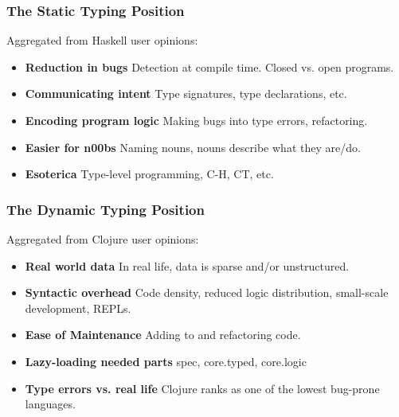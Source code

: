\documentclass{beamer}
\begin{document}

\begin{frame}
  \frametitle{The Static Typing Position}
  Aggregated from Haskell user opinions:
  \begin{itemize}
  \item \textbf{Reduction in bugs} Detection at compile time.  Closed vs. open
    programs.
  \item \textbf{Communicating intent} Type signatures, type declarations, etc.
  \item \textbf{Encoding program logic} Making bugs into type errors, refactoring.
  \item \textbf{Easier for n00bs} Naming nouns, nouns describe what they are/do.
  \item \textbf{Esoterica} Type-level programming, C-H, CT, etc.
  \end{itemize}
\end{frame}

\begin{frame}
  \frametitle{The Dynamic Typing Position}
  Aggregated from Clojure user opinions:
  \begin{itemize}
  \item \textbf{Real world data} In real life, data is sparse and/or unstructured.
  \item \textbf{Syntactic overhead} Code density, reduced logic distribution,
    small-scale development, REPLs.
  \item \textbf{Ease of Maintenance} Adding to and refactoring code.
  \item \textbf{Lazy-loading needed parts} spec, core.typed, core.logic
  \item \textbf{Type errors vs. real life} Clojure ranks as one of the lowest
    bug-prone languages.
  \end{itemize}
\end{frame}
\end{document}
